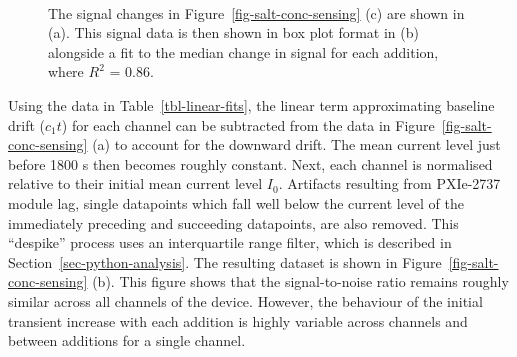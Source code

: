 \documentclass[
  a4paper,
]{scrbook}
\begin{document}
\begin{figure}
\begin{minipage}[t]{0.65\linewidth}
{{}

}

\end{minipage}%
%
\begin{minipage}[t]{0.17\linewidth}

{\centering 

~

}

\end{minipage}%

\caption[Signal changes from the previous figure, alongside a fit to the
median change in signal for each
addition.]{\label{fig-salt-conc-signal}The signal changes in
Figure~\ref{fig-salt-conc-sensing} (c) are shown in (a). This signal
data is then shown in box plot format in (b) alongside a fit to the
median change in signal for each addition, where \(R^2\) = 0.86.}

\end{figure}

Using the data in Table~\ref{tbl-linear-fits}, the linear term
approximating baseline drift (\(c_1t\)) for each channel can be
subtracted from the data in Figure~\ref{fig-salt-conc-sensing} (a) to
account for the downward drift. The mean current level just before 1800
s then becomes roughly constant. Next, each channel is normalised
relative to their initial mean current level \(I_{0}\). Artifacts
resulting from PXIe-2737 module lag, single datapoints which fall well
below the current level of the immediately preceding and succeeding
datapoints, are also removed. This ``despike'' process uses an
interquartile range filter, which is described in
Section~\ref{sec-python-analysis}. The resulting dataset is shown in
Figure~\ref{fig-salt-conc-sensing} (b). This figure shows that the
signal-to-noise ratio remains roughly similar across all channels of the
device. However, the behaviour of the initial transient increase with
each addition is highly variable across channels and between additions
for a single channel.
\end{document}
